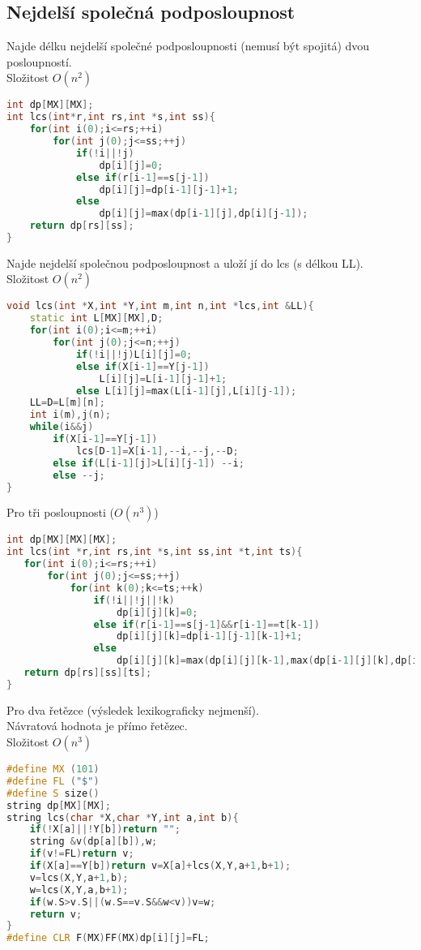 \documentclass[11pt]{article}
\begin{document}
\subsection{Nejdelší společná podposloupnost}
Najde délku nejdelší společné podposloupnosti (nemusí být spojitá) dvou posloupností.
\\Složitost $O(n^2)$
\begin{lstlisting}[language=C++]
int dp[MX][MX];
int lcs(int*r,int rs,int *s,int ss){
    for(int i(0);i<=rs;++i)
        for(int j(0);j<=ss;++j)
            if(!i||!j)
                dp[i][j]=0;
            else if(r[i-1]==s[j-1])
                dp[i][j]=dp[i-1][j-1]+1;
            else
                dp[i][j]=max(dp[i-1][j],dp[i][j-1]);
    return dp[rs][ss];
}
\end{lstlisting}
Najde nejdelší společnou podposloupnost a uloží jí do \textsf{lcs} (s délkou \textsf{LL}).
\\Složitost $O(n^2)$
\begin{lstlisting}[language=C++]
void lcs(int *X,int *Y,int m,int n,int *lcs,int &LL){
    static int L[MX][MX],D;
    for(int i(0);i<=m;++i)
        for(int j(0);j<=n;++j)
            if(!i||!j)L[i][j]=0;
            else if(X[i-1]==Y[j-1])
                L[i][j]=L[i-1][j-1]+1;
            else L[i][j]=max(L[i-1][j],L[i][j-1]);
    LL=D=L[m][n];
    int i(m),j(n);
    while(i&&j)
        if(X[i-1]==Y[j-1])
            lcs[D-1]=X[i-1],--i,--j,--D;
        else if(L[i-1][j]>L[i][j-1]) --i;
        else --j;
}
\end{lstlisting}
\begin{center}
Pro tři posloupnosti ($O(n^3)$)
\end{center}
\begin{lstlisting}[language=C++]
int dp[MX][MX][MX];
int lcs(int *r,int rs,int *s,int ss,int *t,int ts){
   for(int i(0);i<=rs;++i)
       for(int j(0);j<=ss;++j)
           for(int k(0);k<=ts;++k)
               if(!i||!j||!k)
                   dp[i][j][k]=0;
               else if(r[i-1]==s[j-1]&&r[i-1]==t[k-1])
                   dp[i][j][k]=dp[i-1][j-1][k-1]+1;
               else
                   dp[i][j][k]=max(dp[i][j][k-1],max(dp[i-1][j][k],dp[i][j-1][k]));
   return dp[rs][ss][ts];
}
\end{lstlisting}
Pro dva řetězce (výsledek lexikograficky nejmenší).
\\Návratová hodnota je přímo řetězec.
\\Složitost $O(n^3)$
\begin{lstlisting}[language=C++]
#define MX (101)
#define FL ("$")
#define S size()
string dp[MX][MX];
string lcs(char *X,char *Y,int a,int b){
    if(!X[a]||!Y[b])return "";
    string &v(dp[a][b]),w;
    if(v!=FL)return v;
    if(X[a]==Y[b])return v=X[a]+lcs(X,Y,a+1,b+1);
    v=lcs(X,Y,a+1,b);
    w=lcs(X,Y,a,b+1);
    if(w.S>v.S||(w.S==v.S&&w<v))v=w;
    return v;
}
#define CLR F(MX)FF(MX)dp[i][j]=FL;
\end{lstlisting}
\end{document}
